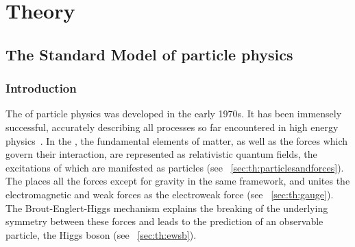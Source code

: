 \chapter{Theory}
\label{chap:theory}

\section{The Standard Model of particle physics}
\subsection{Introduction}

The \SM of particle physics was developed in the early 1970s. %
It has been immensely successful, accurately describing all processes so far encountered in high energy physics~\cite{PDGBooklet}. 
In the \SM, the fundamental elements of matter, as well as the forces which govern their interaction, are represented as relativistic quantum fields, the excitations of which are manifested as particles (see \Sec~\ref{sec:th:particlesandforces}). The \SM places all the forces except for gravity in the same framework, and unites the electromagnetic and weak forces as the electroweak force (see \Sec~\ref{sec:th:gauge}). The Brout-Englert-Higgs mechanism explains the breaking of the underlying symmetry between these forces and leads to the prediction of an observable particle, the Higgs boson (see \Sec~\ref{sec:th:ewsb}). %




